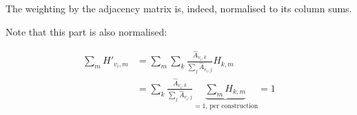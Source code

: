 The weighting by the adjacency matrix is, indeed, normalised to its column sums.

Note that this part is also normalised:

\begin{equation}
\begin{split}
	\sum_m H'_{v_i, m} & = \sum_m \sum_k \frac{\hat{A}_{v_i, k}}{\sum_j \hat{A}_{v_i, j}} H_{k, m} \\
	& = \sum_k \frac{\hat{A}_{v_i, k}}{\sum_j \hat{A}_{v_i, j}} \underbrace{\sum_m H_{k,m}}_{=1\text{, per construction}} = 1
\end{split}
\end{equation}

\newpage
